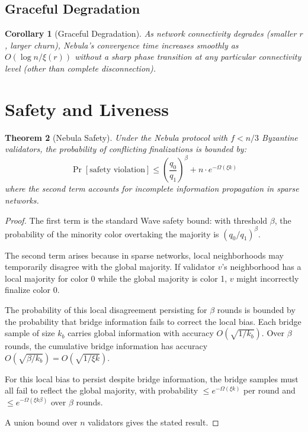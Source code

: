\documentclass[11pt,a4paper]{article}
\newtheorem{theorem}{Theorem}[section]
\newtheorem{corollary}[theorem]{Corollary}
\begin{document}
\subsection{Graceful Degradation}

\begin{corollary}[Graceful Degradation]
\label{cor:graceful}
As network connectivity degrades (smaller $r$, larger churn), Nebula's convergence
time increases smoothly as $O(\log n / \xi(r))$ without a sharp phase transition
at any particular connectivity level (other than complete disconnection).
\end{corollary}

\section{Safety and Liveness}
\label{sec:safety}

\begin{theorem}[Nebula Safety]
\label{thm:nebula-safety}
Under the Nebula protocol with $f < n/3$ Byzantine validators, the probability of
conflicting finalizations is bounded by:
\[
\Pr[\text{safety violation}] \leq \left(\frac{q_0}{q_1}\right)^{\beta} + n \cdot e^{-\Omega(\xi k)}
\]
where the second term accounts for incomplete information propagation in sparse networks.
\end{theorem}

\begin{proof}
The first term is the standard Wave safety bound: with threshold $\beta$, the probability
of the minority color overtaking the majority is $(q_0/q_1)^\beta$.

The second term arises because in sparse networks, local neighborhoods may temporarily
disagree with the global majority. If validator $v$'s neighborhood has a local majority
for color 0 while the global majority is color 1, $v$ might incorrectly finalize color 0.

The probability of this local disagreement persisting for $\beta$ rounds is bounded by
the probability that bridge information fails to correct the local bias. Each bridge
sample of size $k_b$ carries global information with accuracy $O(\sqrt{1/k_b})$. Over
$\beta$ rounds, the cumulative bridge information has accuracy $O(\sqrt{\beta / k_b}) = O(\sqrt{1/\xi k})$.

For this local bias to persist despite bridge information, the bridge samples must
all fail to reflect the global majority, with probability $\leq e^{-\Omega(\xi k)}$ per
round and $\leq e^{-\Omega(\xi k \beta)}$ over $\beta$ rounds.

A union bound over $n$ validators gives the stated result.
\end{proof}
\end{document}
